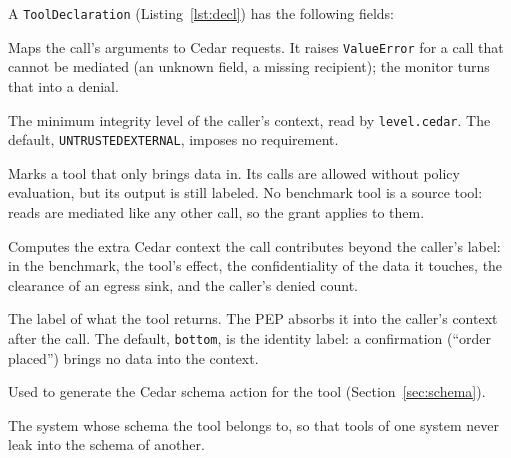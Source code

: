 \documentclass[11pt,a4paper]{article}
\newcommand{\codefont}{\fontfamily{txtt}\selectfont}
\DeclareRobustCommand{\code}[1]{{\renewcommand{\_}{\textunderscore\allowbreak}\texttt{#1}}}
\begin{document}
A \code{ToolDeclaration} (Listing~\ref{lst:decl}) has the following fields:
\begin{description}[style=nextline, leftmargin=1.2em, font=\normalfont\codefont]
  \item[requests] Maps the call's arguments to Cedar requests. It raises
        \code{ValueError} for a call that cannot be mediated (an unknown field, a missing
        recipient); the monitor turns that into a denial.
  \item[required\_level] The minimum integrity level of the caller's context, read by
        \code{level.cedar}. The default, \code{UNTRUSTED\_EXTERNAL}, imposes no
        requirement.
  \item[source] Marks a tool that only brings data in. Its calls are allowed without
        policy evaluation, but its output is still labeled. No benchmark tool is a source
        tool: reads are mediated like any other call, so the grant applies to them.
  \item[context] Computes the extra Cedar context the call contributes beyond the
        caller's label: in the benchmark, the tool's effect, the confidentiality of the
        data it touches, the clearance of an egress sink, and the caller's denied count.
  \item[output\_label] The label of what the tool returns. The PEP absorbs it into the
        caller's context after the call. The default, \code{\_bottom}, is the identity
        label: a confirmation (``order placed'') brings no data into the context.
  \item[resource\_type, action\_groups] Used to generate the Cedar schema action for the
        tool (Section~\ref{sec:schema}).
  \item[system] The system whose schema the tool belongs to, so that tools of one system
        never leak into the schema of another.
\end{description}
\end{document}
